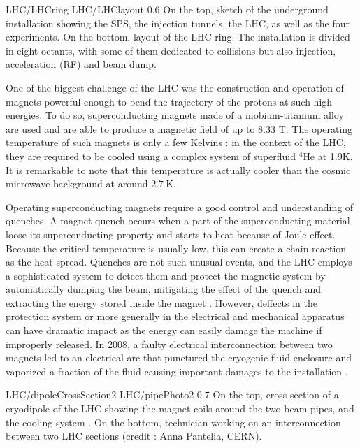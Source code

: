                      {LHC/LHCring}
                     {LHC/LHClayout}
                     {0.6}
                     {On the top, sketch of the underground installation showing the SPS,
                     the injection tunnels, the LHC, as well as the four experiments. On
                     the bottom, layout of the LHC ring. The installation is divided in
                     eight octants, with some of them dedicated to collisions but also
                     injection, acceleration (RF) and beam dump. }

    One of the biggest challenge of the LHC was the construction and operation of magnets
    powerful enough to bend the trajectory of the protons at such high energies. To do
    so, superconducting magnets made of a niobium-titanium alloy are used and are able to
    produce a magnetic field of up to $8.33$ T. The operating temperature of such magnets
    is only a few Kelvins : in the context of the LHC, they are required to be cooled using
    a complex system of superfluid $^4$He at 1.9K. It is remarkable to note that this
    temperature is actually cooler than the cosmic microwave background at around $2.7~\text{K}$.

    Operating superconducting magnets require a good control and understanding of quenches.
    A magnet quench occurs when a part of the superconducting material loose its superconducting
    property and starts to heat because of Joule effect. Because the critical temperature
    is usually low, this can create a chain reaction as the heat spread. Quenches are
    not such unusual events, and the LHC employs a sophisticated system to detect them and protect
    the magnetic system by automatically dumping the beam, mitigating the effect of the
    quench and extracting the energy stored inside the magnet \cite{LHCmagnets}.
    However, deffects in the protection
    system or more generally in the electrical and mechanical apparatus can have dramatic
    impact as the energy can easily damage the machine if improperly released. In 2008,
    a faulty electrical interconnection between two magnets led to an electrical arc that
    punctured the cryogenic fluid enclosure and vaporized a fraction of the fluid causing
    important damages to the installation \cite{LHCindicent}.

                     {LHC/dipoleCrossSection2}
                     {LHC/pipePhoto2}
                     {0.7}
                     {On the top, cross-section of a cryodipole of the LHC
                     showing the magnet coils around the two beam pipes, and the cooling system \cite{LHC}.
                     On the bottom, technician working on an interconnection between two LHC
                     sections (credit : Anna Pantelia, CERN).}

